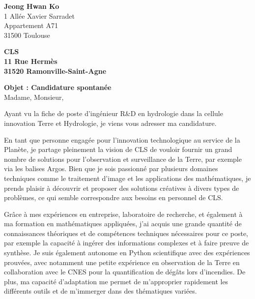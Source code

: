 \documentclass[11pt, a4paper, sans]{article}
\begin{document}
\thispagestyle{empty}
{\raggedright
\textbf{Jeong Hwan Ko}\\1 Allée Xavier Sarradet\\ Appartement A71\\31500 Toulouse}

{\raggedleft
\textbf{CLS\\ 11 Rue Hermès\\ 31520 Ramonville-Saint-Agne\\}
\vspace{5mm}
\raggedright
\textbf{Objet : Candidature spontanée\\}
\vspace{5mm}
\justifying
Madame, Monsieur,

Ayant vu la fiche de poste d'ingénieur R\&D en hydrologie dans la cellule innovation Terre et Hydrologie, je viens vous adresser ma candidature.

En tant que personne engagée pour l'innovation technologique au service de la Planète, je partage pleinement la vision de CLS de vouloir fournir un grand nombre de solutions pour l'observation et surveillance de la Terre, par exemple via les balises Argos. Bien que je sois passionné par plusieurs domaines techniques comme le traitement d'image et les applications des mathématiques, je prends plaisir à  découvrir et proposer des solutions créatives à divers types de problèmes, ce qui semble correspondre aux besoins en personnel de CLS.


Grâce à mes expériences en entreprise, laboratoire de recherche, et également à ma formation en mathématiques appliquées, j'ai acquis une grande quantité de connaissances théoriques et de compétences techniques nécessaires pour ce poste, par exemple la capacité à ingérer des informations complexes et à faire preuve de synthèse. Je suis également autonome en Python scientifique avec des expériences prouvées, avec notamment une petite expérience en observation de la Terre en collaboration avec le CNES pour la quantification de dégâts lors d'incendies. De plus, ma capacité d'adaptation me permet de m'approprier rapidement les différents outils et de m'immerger dans des thématiques variées.

}
\end{document}
